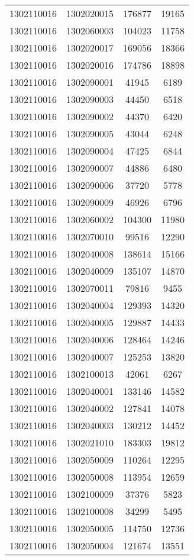 \begin{longtable}{llcc}
1302110016 & 1302020015 & 176877 & 19165\\
1302110016 & 1302060003 & 104023 & 11758\\
1302110016 & 1302020017 & 169056 & 18366\\
1302110016 & 1302020016 & 174786 & 18898\\
1302110016 & 1302090001 & 41945 & 6189\\
1302110016 & 1302090003 & 44450 & 6518\\
1302110016 & 1302090002 & 44370 & 6420\\
1302110016 & 1302090005 & 43044 & 6248\\
1302110016 & 1302090004 & 47425 & 6844\\
1302110016 & 1302090007 & 44886 & 6480\\
1302110016 & 1302090006 & 37720 & 5778\\
1302110016 & 1302090009 & 46926 & 6796\\
1302110016 & 1302060002 & 104300 & 11980\\
1302110016 & 1302070010 & 99516 & 12290\\
1302110016 & 1302040008 & 138614 & 15166\\
1302110016 & 1302040009 & 135107 & 14870\\
1302110016 & 1302070011 & 79816 & 9455\\
1302110016 & 1302040004 & 129393 & 14320\\
1302110016 & 1302040005 & 129887 & 14433\\
1302110016 & 1302040006 & 128464 & 14246\\
1302110016 & 1302040007 & 125253 & 13820\\
1302110016 & 1302100013 & 42061 & 6267\\
1302110016 & 1302040001 & 133146 & 14582\\
1302110016 & 1302040002 & 127841 & 14078\\
1302110016 & 1302040003 & 130212 & 14452\\
1302110016 & 1302021010 & 183303 & 19812\\
1302110016 & 1302050009 & 110264 & 12295\\
1302110016 & 1302050008 & 113954 & 12659\\
1302110016 & 1302100009 & 37376 & 5823\\
1302110016 & 1302100008 & 34299 & 5495\\
1302110016 & 1302050005 & 114750 & 12736\\
1302110016 & 1302050004 & 121674 & 13551\\

\end{longtable}
